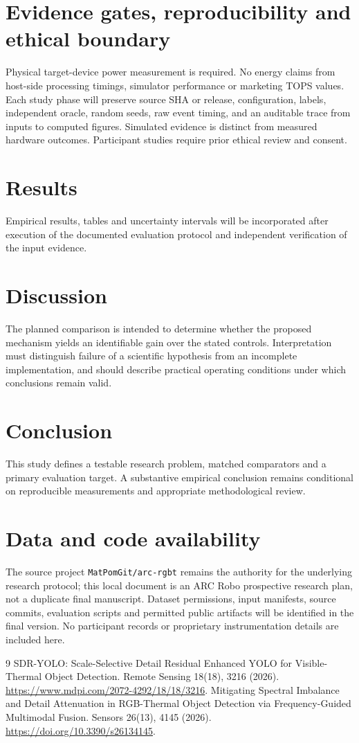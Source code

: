\documentclass[11pt,a4paper]{article}
\begin{document}
\section{Evidence gates, reproducibility and ethical boundary}
Physical target-device power measurement is required. No energy claims from host-side processing timings, simulator performance or marketing TOPS values. Each study phase will preserve source SHA or release, configuration, labels, independent oracle, random seeds, raw event timing, and an auditable trace from inputs to computed figures. Simulated evidence is distinct from measured hardware outcomes. Participant studies require prior ethical review and consent.

\section{Results}
Empirical results, tables and uncertainty intervals will be incorporated after execution of the documented evaluation protocol and independent verification of the input evidence.

\section{Discussion}
The planned comparison is intended to determine whether the proposed mechanism yields an identifiable gain over the stated controls. Interpretation must distinguish failure of a scientific hypothesis from an incomplete implementation, and should describe practical operating conditions under which conclusions remain valid.

\section{Conclusion}
This study defines a testable research problem, matched comparators and a primary evaluation target. A substantive empirical conclusion remains conditional on reproducible measurements and appropriate methodological review.

\section{Data and code availability}
The source project \texttt{MatPomGit/arc-rgbt} remains the authority for the underlying research protocol; this local document is an ARC Robo prospective research plan, not a duplicate final manuscript. Dataset permissions, input manifests, source commits, evaluation scripts and permitted public artifacts will be identified in the final version. No participant records or proprietary instrumentation details are included here.
\begin{thebibliography}{9}
 SDR-YOLO: Scale-Selective Detail Residual Enhanced YOLO for Visible-Thermal Object Detection. Remote Sensing 18(18), 3216 (2026). \url{https://www.mdpi.com/2072-4292/18/18/3216}.
 Mitigating Spectral Imbalance and Detail Attenuation in RGB-Thermal Object Detection via Frequency-Guided Multimodal Fusion. Sensors 26(13), 4145 (2026). \url{https://doi.org/10.3390/s26134145}.
\end{thebibliography}
\end{document}
